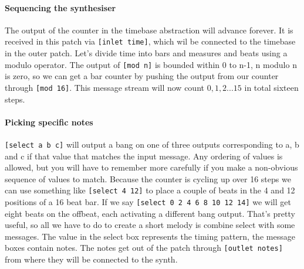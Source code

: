 \paragraph{Sequencing the synthesiser}
The output of the counter in the timebase abstraction will advance forever. It is
received in this patch via \verb+[inlet time]+, which wil be connected to the timebase
in the outer patch. Let's divide
time into bars and measures and beats using a modulo
operator. The output of \verb+[mod n]+ is bounded within 0 to n-1, n modulo n
is zero, so we can get a bar counter by pushing the output from our
counter through \verb+[mod 16]+. This message stream will now count 
${0, 1, 2 ... 15}$ in total sixteen steps.


\paragraph{Picking specific notes}
\verb+[select a b c]+  will output a bang on one of three
outputs corresponding to a, b and c if that value that matches the
input message. Any ordering of values is allowed, but you
will have to remember more carefully if you make a non-obvious
sequence of values to match. Because the counter is cycling up over 16 steps
we can use something like \verb+[select 4 12]+ to place a couple of
beats in the 4 and 12 positions of a 16 beat bar.
If we say \verb+[select 0 2 4 6 8 10 12 14]+ we will get eight
beats on the offbeat, each activating a different bang output. That's
pretty useful, so all we have to do to create a short melody is
combine select with some messages. The value in the select
box represents the timing pattern, the message boxes contain notes.
The notes get out of the patch through \verb+[outlet notes]+ from
where they will be connected to the synth. 